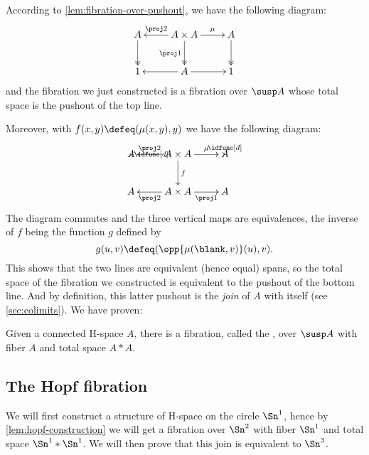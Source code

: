 According to \cref{lem:fibration-over-pushout}, we have the following
diagram:
%
\[\xymatrix{A \ar@{->>}[d] & A \times A \ar[l]_-{\proj2} \ar@{->>}_{\proj1}[d]
  \ar[r]^-{\mu} & A \ar@{->>}[d] \\
  1 & A \ar[r] \ar[l] & 1}\]
%
and the fibration we just constructed is a fibration over $\susp A$ whose total
space is the pushout of the top line.

Moreover, with $f(x,y)\defeq(\mu(x,y),y)$ we have the following diagram:
%
\[\xymatrix{A \ar_\idfunc[d] & A \times A \ar[l]_-{\proj2} \ar^f[d]
  \ar[r]^-{\mu} & A \ar^\idfunc[d] \\
  A & A\times A \ar^-{\proj2}[l] \ar_-{\proj1}[r] & A}\]
%
The diagram commutes and the three vertical maps are equivalences, the inverse
of $f$ being the function $g$ defined by
\[g(u,v)\defeq(\opp{\mu(\blank,v)}(u),v).\]
%
This shows that the two lines are equivalent (hence equal) spans, so the total
space of the fibration we constructed is equivalent to the pushout of the bottom
line.
And by definition, this latter pushout is the \emph{join} of $A$ with itself (see \cref{sec:colimits}).
%
We have proven:

\begin{lem}\label{lem:hopf-construction}
  Given a connected H-space $A$, there is a fibration, called the
  ,
  over $\susp A$ with fiber $A$ and total space $A*A$.
\end{lem}

\subsection{The Hopf fibration}

We will first construct a structure of H-space on the circle $\Sn^1$, hence by
\cref{lem:hopf-construction} we will get a fibration over $\Sn^2$ with fiber
$\Sn^1$ and total space $\Sn^1*\Sn^1$. We will then prove that this join is
equivalent to $\Sn^3$.

